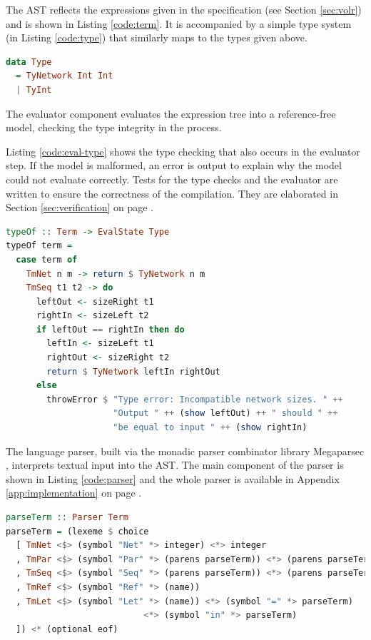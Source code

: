 The AST reflects the expressions given in the 
specification (see Section \ref{sec:volr}) and is
shown in Listing \ref{code:term}.
It is accompanied by a simple type system (in Listing \ref{code:type})
that similarly maps to the types given above.

\begin{lstlisting}[language=haskell,label={code:type},caption={Volr type system
in Haskell}]
data Type 
  = TyNetwork Int Int
  | TyInt
\end{lstlisting}

The evaluator component evaluates the expression tree into
a reference-free model, checking the type integrity in the
process.

Listing \ref{code:eval-type} shows the type checking
that also occurs in the evaluator step. 
If the model is malformed, an error is output to explain why the
model could not evaluate correctly.
Tests for the type checks and the evaluator are written to ensure the
correctness of the compilation.
They are elaborated in Section \ref{sec:verification} on page
\pageref{sec:verification}.

\begin{lstlisting}[language=Haskell,caption={Part of the type checking code in
Haskell.},label={code:eval-type}]
typeOf :: Term -> EvalState Type
typeOf term = 
  case term of
    TmNet n m -> return $ TyNetwork n m
    TmSeq t1 t2 -> do
      leftOut <- sizeRight t1
      rightIn <- sizeLeft t2
      if leftOut == rightIn then do
        leftIn <- sizeLeft t1
        rightOut <- sizeRight t2
        return $ TyNetwork leftIn rightOut
      else
        throwError $ "Type error: Incompatible network sizes. " ++
                     "Output " ++ (show leftOut) ++ " should " ++
                     "be equal to input " ++ (show rightIn)
\end{lstlisting}

The language parser, built via the monadic parser combinator library Megaparsec
\cite{megaparsec}, interprets textual input into the AST. 
The main component of the parser is shown in Listing \ref{code:parser}
and the whole parser is available in Appendix \ref{app:implementation} on page
\pageref{app:implementation_parser}.

\begin{lstlisting}[language=Haskell,name=The main component of the text parser
for Volr.,label={code:parser}]
parseTerm :: Parser Term
parseTerm = (lexeme $ choice
  [ TmNet <$> (symbol "Net" *> integer) <*> integer
  , TmPar <$> (symbol "Par" *> (parens parseTerm)) <*> (parens parseTerm)
  , TmSeq <$> (symbol "Seq" *> (parens parseTerm)) <*> (parens parseTerm)
  , TmRef <$> (symbol "Ref" *> (name))
  , TmLet <$> (symbol "Let" *> (name)) <*> (symbol "=" *> parseTerm)
                           <*> (symbol "in" *> parseTerm)
  ]) <* (optional eof)
\end{lstlisting}

